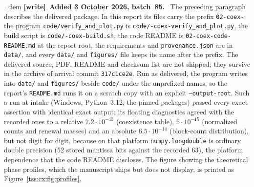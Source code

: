 \documentclass[11pt]{article}
\theoremstyle{remark}\newtheorem{remark}[theorem]{Remark}
\theoremstyle{definition}\newtheorem{definition}[theorem]{Definition}
\newenvironment{writenote}[1][]{\par\smallskip\begingroup\small\emergencystretch=3em
 \noindent\textbf{[write]}\if\relax\detokenize{#1}\relax\else~\textbf{#1.}\fi\ }%
 {\par\endgroup\smallskip}
\begin{document}
\begin{writenote}[Added 3 October 2026, batch~85]
The preceding paragraph describes the delivered package. In this report
its files carry the prefix \texttt{02-coex-}: the program
\texttt{code/\allowbreak verify\_and\_plot.py} is
\texttt{code/-coex-verify\_and\_plot.py}, the build script is
\texttt{code/-coex-build.sh}, the code README is
\texttt{02-coex-code-README.md} at the report root, the requirements and
\texttt{provenance.json} are in \texttt{data/}, and every
\texttt{data/} and \texttt{figures/} file keeps its name after the prefix.
The delivered source, PDF, README and checksum list are not shipped; they
survive in the archive of arrival commit \texttt{317c1ce2e}. Run as
delivered, the program writes into \texttt{data/} and \texttt{figures/}
beside \texttt{code/} under the unprefixed names, so the report's
\texttt{README.md} runs it on a scratch copy with an explicit
\texttt{--output-root}. Such a run at intake (Windows, Python~3.12, the
pinned packages) passed every exact assertion with identical exact output;
its floating diagnostics agreed with the recorded ones to a relative
$7.2\cdot10^{-13}$ (coexistence table), $5\cdot10^{-15}$ (normalized
counts and renewal masses) and an absolute $6.5\cdot10^{-14}$ (block-count
distribution), but not digit for digit, because on that platform \texttt{numpy.longdouble} is
ordinary double precision (52 stored mantissa bits against the recorded
63), the platform dependence that the code README discloses. The figure
showing the theoretical phase profiles, which the manuscript ships but does
not display, is printed as Figure~\ref{tss:cx:fig:profiles}.
\end{writenote}
\end{document}

